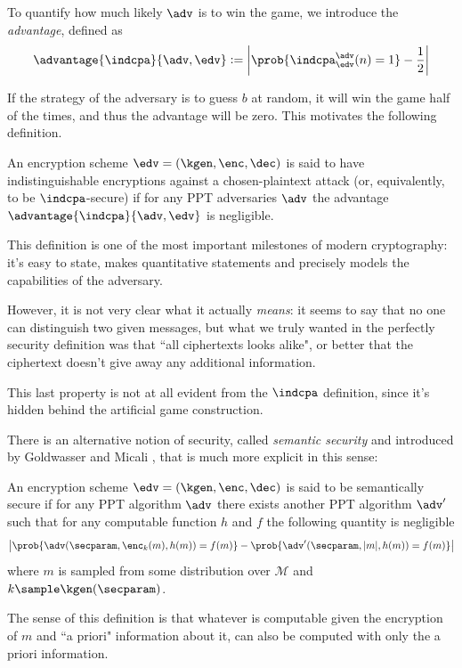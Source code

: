 To quantify how much likely $\adv$ is to win the game, we introduce the \emph{advantage}, defined as
$$\advantage{\indcpa}{\adv,\edv}:=\left| \prob{\indcpa^\adv_\edv(n)=1}-\frac12 \right|$$

If the strategy of the adversary is to guess $b$ at random, it will win the game half of the times, and thus the advantage will be zero. This motivates the following definition.

\begin{definition}
    An encryption scheme $\edv=(\kgen,\enc,\dec)$ is said to have indistinguishable encryptions against a chosen-plaintext attack (or, equivalently, to be $\indcpa$-secure) if for any PPT adversaries $\adv$ the advantage $\advantage{\indcpa}{\adv,\edv}$ is negligible.
\end{definition}

This definition is one of the most important milestones of modern cryptography: it's easy to state, makes quantitative statements and precisely models the capabilities of the adversary.

However, it is not very clear what it actually \emph{means}: it seems to say that no one can distinguish two given messages, but what we truly wanted in the perfectly security definition was that ``all ciphertexts looks alike", or better that the ciphertext doesn't give away any additional information.

This last property is not at all evident from the $\indcpa$ definition, since it's hidden behind the artificial game construction.

There is an alternative notion of security, called \emph{semantic security} and introduced by Goldwasser and Micali \cite{Goldwasser_ss}, that is much more explicit in this sense:
\begin{definition}
    An encryption scheme $\edv=(\kgen,\enc,\dec)$ is said to be semantically secure if for any PPT algorithm $\adv$ there exists another PPT algorithm $\adv'$ such that for any computable function $h$ and $f$ the following quantity is negligible
    $$\left| \prob{\adv(\secparam, \enc_k(m), h(m))=f(m)} - \prob{\adv'(\secparam, |m|, h(m))=f(m)}\right|$$
    where $m$ is sampled from some distribution over $\mathcal M$ and $k\sample\kgen(\secparam)$.
\end{definition}

The sense of this definition is that whatever is computable given the encryption of $m$ and ``a priori" information about it, can also be computed with only the a priori information.

